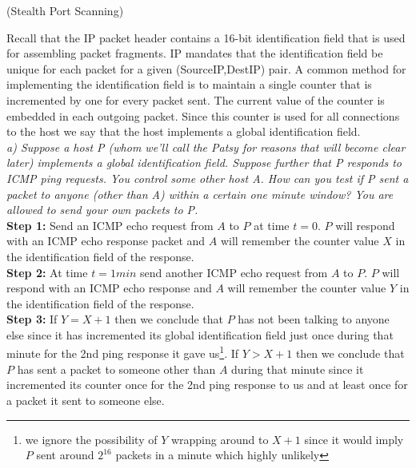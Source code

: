 \begin{prob}  (Stealth Port Scanning) 
\end{prob}

\noindent Recall that the IP packet header contains a 16-bit identification field that is used for assembling packet fragments. IP mandates that the identification field be unique for each packet for a given (SourceIP,DestIP) pair. A common method for implementing the identification field is to maintain a single counter that is incremented by one for every packet sent. The current value of the counter is embedded in each outgoing packet. Since this counter is used for all connections to the host we say that the host implements a global identification field.\\

\noindent \textit{a) Suppose a host P (whom we'll call the Patsy for reasons that will become clear later) implements a global identification field. Suppose further that P responds to ICMP ping requests. You control some other host A. How can you test if P sent a packet to anyone (other than A) within a certain one minute window? You are allowed to send your own packets to P.}\\

\noindent\textbf{Step 1: } Send an ICMP echo request from $A$ to $P$ at time $t=0$. $P$ will respond with an ICMP echo response packet and $A$ will remember the counter value $X$ in the identification field of the response.\\
\noindent\textbf{Step 2: } At time $t=1min$ send another ICMP echo request from $A$ to $P$. $P$ will respond with an ICMP echo response and $A$ will remember the counter value $Y$ in the identification field of the response.\\
\noindent\textbf{Step 3: } If $Y=X+1$ then we conclude that $P$ has not been talking to anyone else since it has incremented its global identification field just once during that minute for the 2nd ping response it gave us\footnote{we ignore the possibility of $Y$ wrapping around to $X+1$ since it would imply $P$ sent around $2^{16}$ packets in a minute which highly unlikely}. If $Y>X+1$ then we conclude that $P$ has sent a packet to someone other than $A$ during that minute since it incremented its counter once for the 2nd ping response to us and at least once for a packet it sent to someone else.\\
 

